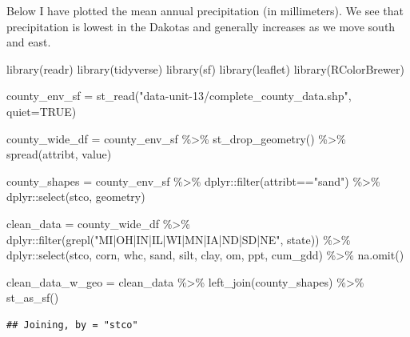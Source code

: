 \documentclass[
]{book}
\newenvironment{Shaded}{\begin{snugshade}}{\end{snugshade}}
\newcommand{\AttributeTok}[1]{\textcolor[rgb]{0.77,0.63,0.00}{#1}}
\newcommand{\ConstantTok}[1]{\textcolor[rgb]{0.00,0.00,0.00}{#1}}
\newcommand{\FunctionTok}[1]{\textcolor[rgb]{0.00,0.00,0.00}{#1}}
\newcommand{\NormalTok}[1]{#1}
\newcommand{\OtherTok}[1]{\textcolor[rgb]{0.56,0.35,0.01}{#1}}
\newcommand{\SpecialCharTok}[1]{\textcolor[rgb]{0.00,0.00,0.00}{#1}}
\newcommand{\StringTok}[1]{\textcolor[rgb]{0.31,0.60,0.02}{#1}}
\begin{document}
Below I have plotted the mean annual precipitation (in millimeters). We see that precipitation is lowest in the Dakotas and generally increases as we move south and east.

\begin{Shaded}
\begin{Highlighting}[]
\FunctionTok{library}\NormalTok{(readr)}
\FunctionTok{library}\NormalTok{(tidyverse)}
\FunctionTok{library}\NormalTok{(sf)}
\FunctionTok{library}\NormalTok{(leaflet)}
\FunctionTok{library}\NormalTok{(RColorBrewer)}

\NormalTok{county\_env\_sf }\OtherTok{=} \FunctionTok{st\_read}\NormalTok{(}\StringTok{"data{-}unit{-}13/complete\_county\_data.shp"}\NormalTok{, }\AttributeTok{quiet=}\ConstantTok{TRUE}\NormalTok{) }

\NormalTok{county\_wide\_df }\OtherTok{=}\NormalTok{ county\_env\_sf }\SpecialCharTok{\%\textgreater{}\%}
  \FunctionTok{st\_drop\_geometry}\NormalTok{() }\SpecialCharTok{\%\textgreater{}\%}
  \FunctionTok{spread}\NormalTok{(attribt, value)}

\NormalTok{county\_shapes }\OtherTok{=}\NormalTok{ county\_env\_sf }\SpecialCharTok{\%\textgreater{}\%}
\NormalTok{  dplyr}\SpecialCharTok{::}\FunctionTok{filter}\NormalTok{(attribt}\SpecialCharTok{==}\StringTok{"sand"}\NormalTok{) }\SpecialCharTok{\%\textgreater{}\%}
\NormalTok{  dplyr}\SpecialCharTok{::}\FunctionTok{select}\NormalTok{(stco, geometry)}

\NormalTok{clean\_data }\OtherTok{=}\NormalTok{ county\_wide\_df }\SpecialCharTok{\%\textgreater{}\%}
\NormalTok{  dplyr}\SpecialCharTok{::}\FunctionTok{filter}\NormalTok{(}\FunctionTok{grepl}\NormalTok{(}\StringTok{"MI|OH|IN|IL|WI|MN|IA|ND|SD|NE"}\NormalTok{, state)) }\SpecialCharTok{\%\textgreater{}\%}  
\NormalTok{  dplyr}\SpecialCharTok{::}\FunctionTok{select}\NormalTok{(stco, corn, whc, sand, silt, clay, om, ppt, cum\_gdd) }\SpecialCharTok{\%\textgreater{}\%}
  \FunctionTok{na.omit}\NormalTok{()}



\NormalTok{clean\_data\_w\_geo }\OtherTok{=}\NormalTok{ clean\_data }\SpecialCharTok{\%\textgreater{}\%}
  \FunctionTok{left\_join}\NormalTok{(county\_shapes) }\SpecialCharTok{\%\textgreater{}\%}
  \FunctionTok{st\_as\_sf}\NormalTok{()}
\end{Highlighting}
\end{Shaded}

\begin{verbatim}
## Joining, by = "stco"
\end{verbatim}
\end{document}

